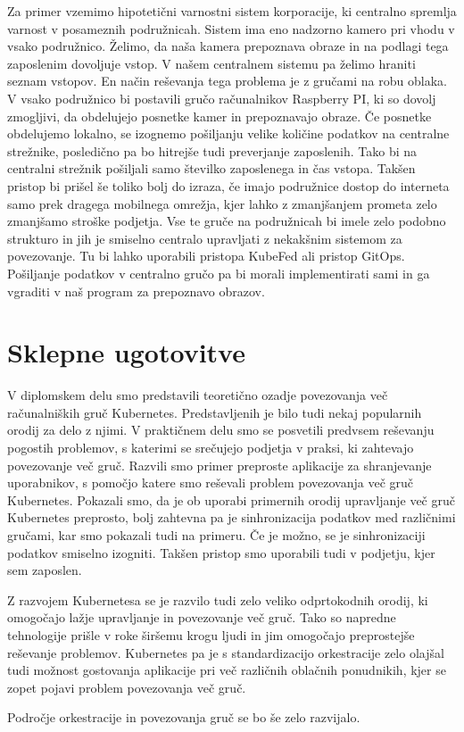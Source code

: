 \documentclass[a4paper, 12pt]{book}
\begin{document}
Za primer vzemimo hipotetični varnostni sistem korporacije, ki centralno spremlja varnost v posameznih podružnicah.
Sistem ima eno nadzorno kamero pri vhodu v vsako podružnico.
Želimo, da naša kamera prepoznava obraze in na podlagi tega zaposlenim dovoljuje vstop.
V našem centralnem sistemu pa želimo hraniti seznam vstopov.
En način reševanja tega problema je z gručami na robu oblaka.
V vsako podružnico bi postavili gručo rač\-un\-al\-ni\-kov Raspberry PI, ki so dovolj zmogljivi, da obdelujejo posnetke kamer in prepoznavajo obraze.
Če posnetke obdelujemo lokalno, se izognemo pošiljanju velike količine podatkov na centralne strežnike, posledično pa bo hitrejše tudi preverjanje zaposlenih.
Tako bi na centralni strežnik pošiljali samo številko zaposlenega in čas vstopa.
Takšen pristop bi prišel še toliko bolj do izraza, če imajo podružnice dostop do interneta samo prek dragega mobilnega omrežja, kjer lahko z zmanjšanjem prometa zelo zmanjšamo stroške podjetja.
Vse te gruče na podružnicah bi imele zelo podobno strukturo in jih je smiselno centralo upravljati z nekakšnim sistemom za povezovanje. 
Tu bi lahko uporabili pristopa KubeFed ali pristop GitOps.
Pošiljanje podatkov v centralno gručo pa bi morali implementirati sami in ga vgraditi v naš program za prepoznavo obrazov.
\chapter{Sklepne ugotovitve}
V diplomskem delu smo predstavili teoretično ozadje povezovanja več rač\-un\-al\-ni\-ških gruč Kubernetes.
Predstavljenih je bilo tudi nekaj popularnih orodij za delo z njimi.
V praktičnem delu smo se posvetili predvsem reševanju pogostih problemov, s katerimi se srečujejo podjetja v praksi, ki zahtevajo povezovanje več gruč.
Razvili smo primer preproste aplikacije za shranjevanje uporabnikov, s pomočjo katere smo reševali problem povezovanja več gruč Kubernetes.
Pokazali smo, da je ob uporabi primernih orodij upravljanje več gruč Kubernetes preprosto, bolj zahtevna pa je sinhronizacija podatkov med različnimi gručami, kar smo pokazali tudi na primeru.
Če je možno, se je sinhronizaciji podatkov smiselno izogniti.
Takšen pristop smo uporabili tudi v podjetju, kjer sem zaposlen.

Z razvojem Kubernetesa se je razvilo tudi zelo veliko odprtokodnih orodij, ki omogočajo lažje upravljanje in povezovanje več gruč.
Tako so napredne tehnologije prišle v roke širšemu krogu ljudi in jim omogočajo preprostejše reševanje problemov.
Kubernetes pa je s standardizacijo orkestracije zelo olajšal tudi možnost gostovanja aplikacije pri več različnih oblačnih ponudnikih, kjer se zopet pojavi problem povezovanja več gruč.

Področje orkestracije in povezovanja gruč se bo še zelo razvijalo.

\newpage %
\newpage %
\newpage %
\newpage %
\ \\
\clearpage
{}


\end{document}
